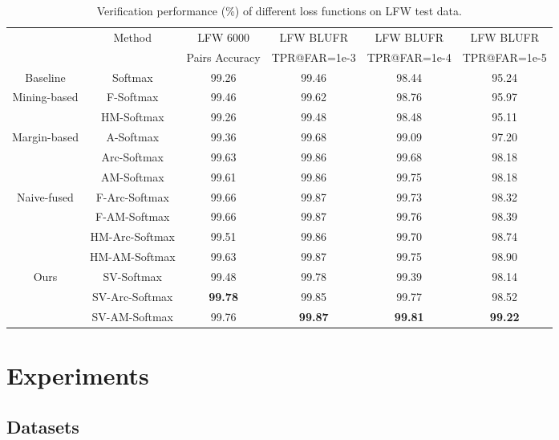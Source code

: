 \documentclass[10pt,twocolumn,letterpaper]{article}
\begin{document}
\begin{table*}
\begin{center}
\begin{tabular}{|c|c|c|c|c|c| }
\hline
& \multirow{2}{*}{Method}  & LFW 6000 & LFW BLUFR   & LFW BLUFR   & LFW BLUFR    \\
&         & Pairs Accuracy & TPR@FAR=1e-3      & TPR@FAR=1e-4      & TPR@FAR=1e-5       \\

\hline\hline
Baseline & Softmax                       & 99.26 & 99.46 &	98.44 & 95.24 \\
\hline
\multirow{2}{*}{Mining-based}& F-Softmax  \cite{Focal}       & 99.46 & 99.62 & 98.76 & 95.97 \\
& HM-Softmax \cite{OHEM}        & 99.26 & 99.48 & 98.48 & 95.11 \\
\hline
\multirow{3}{*}{Margin-based} & A-Softmax  \cite{SphereFace}  & 99.36 & 99.68 & 99.09 & 97.20 \\
& Arc-Softmax\cite{Arc-Softmax} & 99.63 & 99.86 & 99.68 & 98.18 \\
& AM-Softmax \cite{AM-Softmax}  & 99.61 & 99.86 & 99.75 & 98.18 \\
\hline
\multirow{4}{*}{Naive-fused}& F-Arc-Softmax & 99.66	& 99.87 & 99.73 & 98.32 \\
& F-AM-Softmax  & 99.66 & 99.87 & 99.76 & 98.39 \\
& HM-Arc-Softmax                & 99.51	& 99.86 & 99.70	& 98.74	 \\
& HM-AM-Softmax                 & 99.63 & 99.87 & 99.75 & 98.90 \\
\hline
\multirow{3}{*}{Ours}& SV-Softmax   & 99.48 & 99.78 & 99.39 & 98.14  \\
& SV-Arc-Softmax                    & \textbf{99.78} & 99.85  & 99.77 & 98.52 \\
& SV-AM-Softmax                     & 99.76 & \textbf{99.87}  & \textbf{99.81} & \textbf{99.22} \\
\hline
\end{tabular}
\end{center}		
\caption{Verification performance (\%) of different loss functions on LFW test data.}
\label{LFW}
\end{table*}

\section{Experiments}


\subsection{Datasets}
\end{document}
